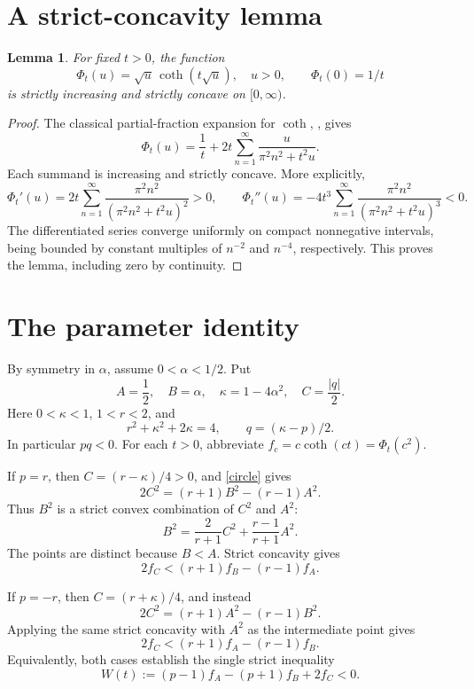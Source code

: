 \documentclass[11pt]{article}
\newtheorem{lemma}{Lemma}
\begin{document}
\section*{A strict-concavity lemma}
\begin{lemma}\label{concavity}
For fixed \(t>0\), the function
\[
 \Phi_t(u)=\sqrt u\,\coth(t\sqrt u),\quad u>0,\qquad
 \Phi_t(0)=1/t
\]
is strictly increasing and strictly concave on \([0,\infty)\).
\end{lemma}
\begin{proof}
The classical partial-fraction expansion for \(\coth\),
\cite[Eq.~4.36.3]{DLMF}, gives
\[
 \Phi_t(u)=\frac1t+
       2t\sum_{n=1}^{\infty}\frac{u}{\pi^2n^2+t^2u}.
\]
Each summand is increasing and strictly concave. More explicitly,
\[
 \Phi_t'(u)=2t\sum_{n=1}^{\infty}
       \frac{\pi^2n^2}{(\pi^2n^2+t^2u)^2}>0,\qquad
 \Phi_t''(u)=-4t^3\sum_{n=1}^{\infty}
       \frac{\pi^2n^2}{(\pi^2n^2+t^2u)^3}<0.
\]
The differentiated series converge uniformly on compact nonnegative
intervals, being bounded by constant multiples of \(n^{-2}\) and
\(n^{-4}\), respectively. This proves the lemma, including zero by
continuity.
\end{proof}

\section*{The parameter identity}
By symmetry in \(\alpha\), assume \(0<\alpha<1/2\). Put
\[
 A=\frac12,\quad B=\alpha,\quad
 \kappa=1-4\alpha^2,\quad C=\frac{|q|}{2}.
\]
Here \(0<\kappa<1\), \(1<r<2\), and
\begin{equation}\label{circle}
 r^2+\kappa^2+2\kappa=4,\qquad q=(\kappa-p)/2.
\end{equation}
In particular \(pq<0\).
For each \(t>0\), abbreviate
\(f_c=c\coth(ct)=\Phi_t(c^2)\).

If \(p=r\), then \(C=(r-\kappa)/4>0\), and \eqref{circle} gives
\[
 2C^2=(r+1)B^2-(r-1)A^2.
\]
Thus \(B^2\) is a strict convex combination of \(C^2\) and \(A^2\):
\[
 B^2=\frac2{r+1}C^2+\frac{r-1}{r+1}A^2.
\]
The points are distinct because \(B<A\). Strict concavity gives
\begin{equation}\label{pos}
 2f_C<(r+1)f_B-(r-1)f_A.
\end{equation}

If \(p=-r\), then \(C=(r+\kappa)/4\), and instead
\[
 2C^2=(r+1)A^2-(r-1)B^2.
\]
Applying the same strict concavity with \(A^2\) as the intermediate
point gives
\begin{equation}\label{neg}
 2f_C<(r+1)f_A-(r-1)f_B.
\end{equation}
Equivalently, both cases establish the single strict inequality
\begin{equation}\label{W}
 W(t):=(p-1)f_A-(p+1)f_B+2f_C<0.
\end{equation}
\end{document}
